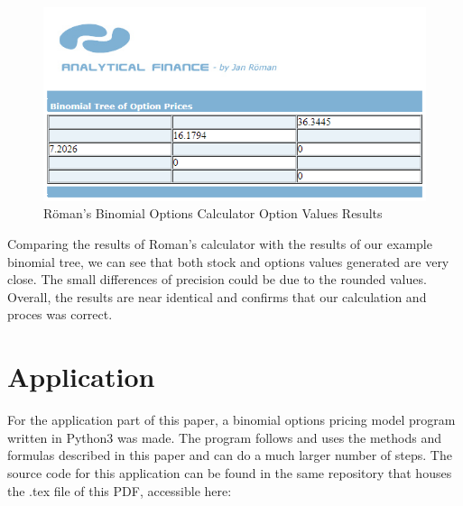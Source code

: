 \documentclass[12pt, letterpaper]{article}\usepackage{float}
\begin{document}
\begin{figure}[H]
  \includegraphics{Roman_binomial_calculator_option_values}
  \caption{R\"{o}man's Binomial Options Calculator Option Values Results}
\end{figure}

Comparing the results of Roman's calculator with the results of our example binomial tree, we can see that both stock and options values generated are very close.
The small differences of precision could be due to the rounded values.
Overall, the results are near identical and confirms that our calculation and proces was correct.

\pagebreak

\section*{Application}
For the application part of this paper, a binomial options pricing model program written in Python3 was made.
The program follows and uses the methods and formulas described in this paper and can do a much larger number of steps.
The source code for this application can be found in the same repository that houses the .tex file of this PDF, accessible here:
\href{https://github.com/cliuj/binomial-options-pricing-model}{\color{blue}{https://github.com/cliuj/binomial-options-pricing-model}}
\end{document}
